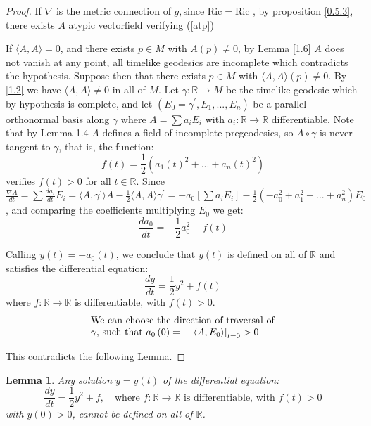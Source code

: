 \documentclass{amsart}%
\theoremstyle{plain}
\newtheorem{lemma}{Lemma}
\numberwithin{equation}{section}
\begin{document}
\begin{proof}
If $\nabla$ is the metric connection of $g,$since $\overline{\mathrm{Ric}%
}=\mathrm{Ric}$ , by proposition \ref{0.5.3}, there exists $A$ atypic
vectorfield verifying (\ref{atp})

If $\langle A,A\rangle=0$, and there exists $p\in M$ with $A(p)\neq0$, by
Lemma \ref{1.6} $A$ does not vanish at any point, all timelike geodesics are
incomplete which contradicts the hypothesis. Suppose then that there exists
$p\in M$ with $\langle A,A\rangle(p)\neq0$. By \ref{1.2} we have $\langle
A,A\rangle\neq0$ in all of $M$. Let $\gamma:\mathbb{R}\longrightarrow M$ be
the timelike geodesic which by hypothesis is complete, and let $(E_{0}%
=\gamma^{\prime},E_{1},...,E_{n})$ be a parallel orthonormal basis along
$\gamma$ where $A=\sum a_{i}E_{i}$ with $a_{i}:\mathbb{R}\rightarrow
\mathbb{R}$ differentiable. Note that by Lemma 1.4 $A$ defines a field of
incomplete pregeodesics, so $A\circ\gamma$ is never tangent to $\gamma$, that
is, the function:
\[
f(t)=\frac{1}{2}(a_{1}(t)^{2}+...+a_{n}(t)^{2})
\]
verifies $f(t)>0$ for all $t\in\mathbb{R}$. Since $\frac{\nabla A}{dt}%
=\sum\frac{da_{i}}{dt}E_{i}=\langle A,\gamma^{\prime}\rangle A-\frac{1}%
{2}\langle A,A\rangle\gamma^{\prime}=-a_{0}[\sum a_{i}E_{i}]-\frac{1}%
{2}(-a_{0}^{2}+a_{1}^{2}+...+a_{n}^{2})E_{0}$, and comparing the coefficients
multiplying $E_{0}$ we get:
\[
\frac{da_{0}}{dt}=-\frac{1}{2}a_{0}^{2}-f(t)
\]


Calling $y(t)=-a_{0}(t)$, we conclude that $y(t)$ is defined on all of
$\mathbb{R}$ and satisfies the differential equation:
\begin{equation}
\frac{dy}{dt}=\frac{1}{2}y^{2}+f(t) \label{EDO}%
\end{equation}
where $f:\mathbb{R}\longrightarrow\mathbb{R}$ is differentiable, with
$f(t)>0$.
\[%
\begin{tabular}
[c]{l}%
We can choose the direction of traversal of\\
$\gamma$, such that $a_{0}\left(  0\right)  =-\left.  \left\langle
A,E_{0}\right\rangle \right\vert _{t=0}>0$%
\end{tabular}
\]


This contradicts the following Lemma.
\end{proof}

\begin{lemma}
Any solution $y=y\left(  t\right)  $ of the differential equation:
\[
\frac{dy}{dt}=\frac{1}{2}y^{2}+f,\quad\text{where }f:\mathbb{R}\rightarrow
\mathbb{R}\text{ is differentiable, with }f(t)>0
\]
with $y\left(  0\right)  >0$, cannot be defined on all of $\mathbb{R}$.
\end{lemma}
\end{document}
